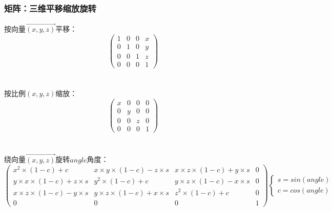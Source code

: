     \subsubsection{矩阵：三维平移缩放旋转}
	按向量$\overrightarrow{(x,y,z)}$平移：
	\[\begin{pmatrix}
	1 & 0 & 0 & x\\ 
	0 & 1 & 0 & y\\ 
	0 & 0 & 1 & z\\ 
	0 & 0 & 0 & 1
	\end{pmatrix}\]\\
	\\
	按比例$(x,y,z)$缩放：
	\[\begin{pmatrix}
	x & 0 & 0 & 0\\ 
	0 & y & 0 & 0\\ 
	0 & 0 & z & 0\\ 
	0 & 0 & 0 & 1
	\end{pmatrix}\]\\
	\\
	绕向量$\overrightarrow{(x,y,z)}$旋转$angle$角度：
	\[\begin{pmatrix}
	x^2\times (1-c)+c & x\times y\times (1-c)-z\times s & x\times z\times (1-c)+y\times s & 0\\ 
	y\times x\times (1-c)+z\times s & y^2\times (1-c)+c & y\times z\times (1-c)-x\times s & 0\\ 
	x\times z\times (1-c)-y\times s & y\times z\times (1-c)+x\times s & z^2\times (1-c)+c & 0\\ 
	0 & 0 & 0 & 1
	\end{pmatrix}
	\begin{cases}
	s=sin(angle)\\
	c=cos(angle)
	\end{cases}\]